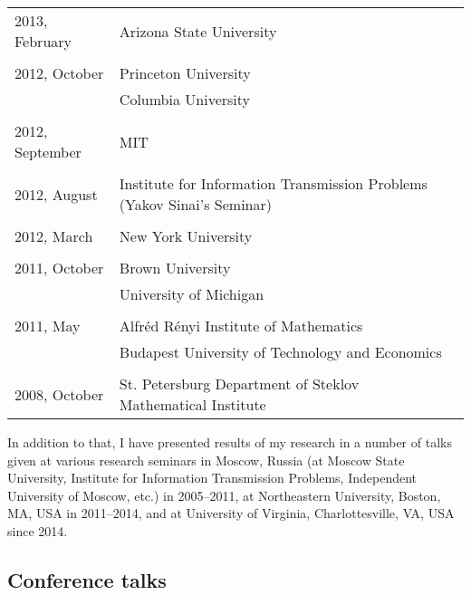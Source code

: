 \documentclass[letterpaper,11pt]{article}
\begin{document}
\begin{longtable}{llc}
	2013, February & Arizona State University\\\\

	2012, October & Princeton University \\
	& Columbia University\\\\

	2012, September & MIT \\\\

	2012, August
	& Institute for Information Transmission Problems
	(Yakov Sinai's Seminar)
	\\\\

	2012, March & New York University\\\\

	2011, October & Brown University \\
	&University of Michigan
	\\
	\\
	2011, May& Alfr\'ed R\'enyi Institute of Mathematics
	\\
	& Budapest University of Technology and Economics
	\\\\

	2008, October &
	St. Petersburg Department of Steklov Mathematical
	Institute%
	\\
\end{longtable}
\bigskip

In addition to that, I have presented results of my research in a number of
talks given at various research seminars in Moscow, Russia (at Moscow State
University, Institute for Information Transmission Problems, Independent
University of Moscow, etc.) in 2005--2011, at Northeastern University, Boston,
MA, USA in 2011--2014, and at University of Virginia, Charlottesville, VA, USA
since 2014.

\subsection*{Conference talks}
\end{document}
